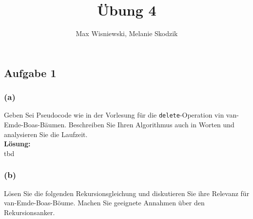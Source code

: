 \documentclass[11pt,a4paper,ngerman]{article}
\date{}
\title{Übung 4}
\author{Max Wisniewski, Melanie Skodzik}
\begin{document}

\renewcommand{\figurename}{Grafik}

\maketitle
\thispagestyle{fancy}


\subsection*{Aufgabe 1}

\subsubsection*{(a)}

Geben Sei Pseudocode wie in der Vorlesung für die \lstinline|delete|-Operation vin van-Emde-Boas-Bäumen. Beschreiben Sie Ihren Algorithmus auch in Worten und analysieren Sie die Laufzeit.\\

\noindent\textbf{Lösung:}\\

tbd

\subsubsection*{(b)}

Lösen Sie die folgenden Rekursionsgleichung und diskutieren Sie ihre Relevanz für van-Emde-Boas-Böume. Machen Sie geeignete Annahmen über den Rekursionsanker.
\end{document}
